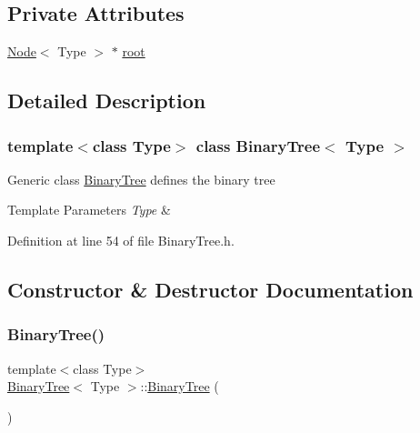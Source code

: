 \subsection*{Private Attributes}
\begin{DoxyCompactItemize}
\item 
\hyperlink{class_node}{Node}$<$ Type $>$ $\ast$ \hyperlink{class_binary_tree_a8744322abfc99966f7d23d8560ed5702}{root}
\end{DoxyCompactItemize}


\subsection{Detailed Description}
\subsubsection*{template$<$class Type$>$\newline
class Binary\+Tree$<$ Type $>$}

Generic class \hyperlink{class_binary_tree}{Binary\+Tree} defines the binary tree 
\begin{DoxyTemplParams}{Template Parameters}
{\em Type} & \\
\hline
\end{DoxyTemplParams}


Definition at line 54 of file Binary\+Tree.\+h.



\subsection{Constructor \& Destructor Documentation}
\mbox{\label{class_binary_tree_a9f5a2d791e391c6195ef290303973e15}} 
\subsubsection{\texorpdfstring{Binary\+Tree()}{BinaryTree()}}
{\footnotesize\ttfamily template$<$class Type$>$ \\
\hyperlink{class_binary_tree}{Binary\+Tree}$<$ Type $>$\+::\hyperlink{class_binary_tree}{Binary\+Tree} (\begin{DoxyParamCaption}{ }\end{DoxyParamCaption})\hspace{0.3cm}{\ttfamily [inline]}}

